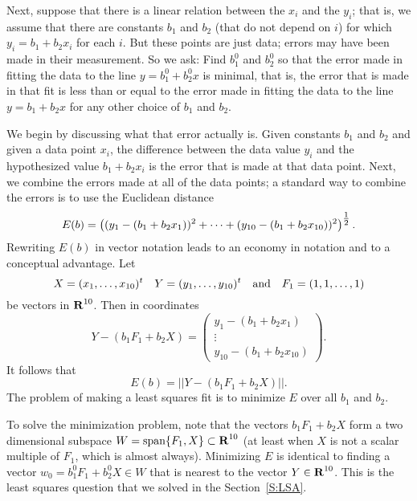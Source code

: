 Next, suppose that there is a linear relation between the $x_i$ and the $y_i$;
that is, we assume that there are constants $b_1$ and $b_2$ (that do not
depend on $i$) for which $y_i=b_1+b_2x_i$ for each $i$. But these points are
just data; errors may have been made in their measurement.  So we ask:  Find
$b_1^0$ and $b_2^0$ so that the error made in fitting the data to the line
$y=b_1^0+b_2^0x$ is minimal, that is, the error that is made in that fit is
less than or equal to the error made in fitting the data to the line
$y=b_1+b_2x$ for any other choice of $b_1$ and $b_2$.

We begin by discussing what that error actually is.  Given constants $b_1$ and
$b_2$ and given a data point $x_i$, the difference between the
data value
$y_i$ and the hypothesized value $b_1+b_2x_i$ is the error that is made at that
data point.  Next, we combine the errors made at all of the data points; a
standard way to combine the errors is to use the
Euclidean distance
\[
E(b) =
\left((y_1-(b_1+b_2x_1))^2+\cdots+(y_{10}-(b_1+b_2x_{10}))^2\right)^{\mbox{$\frac{1}{2}$}}.
\]
Rewriting $E(b)$ in vector notation leads to an economy in notation and
to a conceptual advantage.  Let
\[
X=(x_1,\ldots,x_{10})^t \quad Y=(y_1,\ldots,y_{10})^t \quad\mbox{and}\quad
F_1=(1,1,\ldots,1)
\]
be vectors in $\mbox{$\bf{R}$}^{10}$.  Then in coordinates
\[
Y-(b_1F_1+b_2X) = \left(\begin{array}{c} y_1-(b_1+b_2x_1)\\ \vdots\\
y_{10}-(b_1+b_2x_{10})\end{array}\right).
\]
It follows that
\[
E(b) = ||Y-(b_1F_1+b_2X)||.
\]
The problem of making a least squares fit is to minimize $E$ over all $b_1$
and $b_2$.

To solve the minimization problem,
note that the vectors $b_1F_1+b_2X$ form
a two dimensional subspace $W={\rm span}\{F_1,X\}\subset\mbox{$\bf{R}$}^{10}$
 (at least when $X$
is not a scalar multiple of $F_1$, which is almost always).  Minimizing $E$ is
identical to finding a vector $w_0=b_1^0F_1+b_2^0X\in W$ that is nearest to
the vector $Y\in\mbox{$\bf{R}$}^{10}$.   This is the
least squares question that we solved
in the Section~\ref{S:LSA}.

